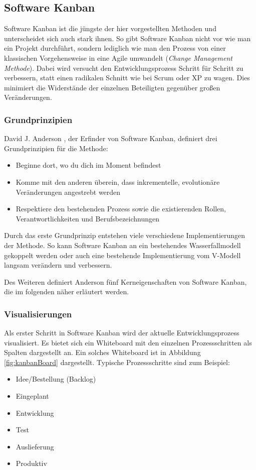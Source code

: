 \subsection{Software Kanban}
Software Kanban ist die jüngste der hier vorgestellten Methoden und unterscheidet sich auch stark ihnen. So gibt Software Kanban nicht vor wie man ein Projekt durchführt, sondern lediglich wie man den Prozess von einer klassischen Vorgehensweise in eine Agile umwandelt (\emph{Change Management Methode}). \cite[S. 14]{bib:wolfRoock} Dabei wird versucht den Entwicklungsprozess Schritt für Schritt zu verbessern, statt einen radikalen Schnitt wie bei Scrum oder XP zu wagen. Dies minimiert die Widerstände der einzelnen Beteiligten gegenüber großen Veränderungen. \cite{bib:ix2011}

\subsubsection{Grundprinzipien}
David J. Anderson \cite{bib:anderson}, der Erfinder von Software Kanban, definiert drei Grundprinzipien für die Methode:
\begin{itemize}
  \item Beginne dort, wo du dich im Moment befindest
  \item Komme mit den anderen überein, dass inkrementelle, evolutionäre Veränderungen angestrebt werden
  \item Respektiere den bestehenden Prozess sowie die existierenden Rollen, Verantwortlichkeiten und Berufsbezeichnungen
\end{itemize}

Durch das erste Grundprinzip entstehen viele verschiedene Implementierungen der Methode. So kann Software Kanban an ein bestehendes Wasserfallmodell gekoppelt werden oder auch eine bestehende Implementierung vom V-Modell langsam verändern und verbessern.

Des Weiteren definiert Anderson fünf Kerneigenschaften von Software Kanban, die im folgenden näher erläutert werden.

\subsubsection{Visualisierungen}
Als erster Schritt in Software Kanban wird der aktuelle Entwicklungsprozess visualisiert. Es bietet sich ein Whiteboard mit den einzelnen Prozessschritten als Spalten dargestellt an. Ein solches Whiteboard ist in Abbildung \ref{fig:kanbanBoard} dargestellt. Typische Prozessschritte sind zum Beispiel:
\begin{itemize}
  \item Idee/Bestellung (Backlog)
  \item Eingeplant
  \item Entwicklung
  \item Test
  \item Auslieferung
  \item Produktiv
\end{itemize}

